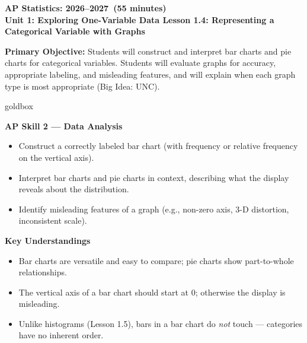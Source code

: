 \documentclass[10pt]{article}
\begin{document}
\def\CourseName{AP Statistics}
\def\SchoolYear{2026--2027}
\def\MeetingLength{55 minutes}
\def\UnitNumberName{Unit 1: Exploring One-Variable Data \quad}
\def\LessonNumberName{Lesson 1.4: Representing a Categorical Variable with Graphs}

\begin{center}
    {\Large\bfseries \CourseName: \SchoolYear\ (\MeetingLength) \\
    {\small\bfseries \UnitNumberName \LessonNumberName}}
\end{center}

\begin{tcolorbox}[colback=sky,colframe=navy,boxrule=0.9pt,arc=2mm,
    left=2mm,right=2mm,top=1.5mm,bottom=1.5mm]
    \textbf{Primary Objective:} Students will construct and interpret bar charts and pie charts
    for categorical variables. Students will evaluate graphs for accuracy, appropriate labeling,
    and misleading features, and will explain when each graph type is most appropriate (Big Idea: UNC).
\end{tcolorbox}

\begin{skillbox}{goldbox}
\begin{minipage}[t]{0.48\linewidth}
    \textbf{AP Skill 2 --- Data Analysis}
    \begin{itemize}
        \item Construct a correctly labeled bar chart (with frequency or relative frequency on the vertical axis).
        \item Interpret bar charts and pie charts in context, describing what the display reveals about the distribution.
        \item Identify misleading features of a graph (e.g., non-zero axis, 3-D distortion, inconsistent scale).
    \end{itemize}
\end{minipage}
\hfill
\begin{minipage}[t]{0.48\linewidth}
    \textbf{Key Understandings}
    \begin{itemize}
        \item Bar charts are versatile and easy to compare; pie charts show part-to-whole relationships.
        \item The vertical axis of a bar chart should start at 0; otherwise the display is misleading.
        \item Unlike histograms (Lesson 1.5), bars in a bar chart do \textit{not} touch --- categories have no inherent order.
    \end{itemize}
\end{minipage}
\end{skillbox}
\end{document}
